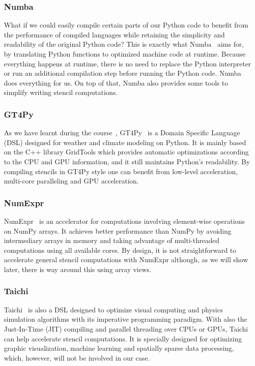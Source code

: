 \documentclass[12pt]{article}
\begin{document}
\subsubsection{Numba}

What if we could easily compile certain parts of our Python code to benefit from the performance of compiled languages while retaining the simplicity and readability of the original Python code? This is exactly what Numba~\cite{Numba} aims for, by translating Python functions to optimized machine code at runtime. Because everything happens at runtime, there is no need to replace the Python interpreter or run an additional compilation step before running the Python code. Numba does everything for us. On top of that, Numba also provides some tools to simplify writing stencil computations.

\subsubsection{GT4Py}

As we have learnt during the course~\cite{HPC4WC}, GT4Py~\cite{GT4Py} is a Domain Specific Language (DSL) designed for weather and climate modeling on Python. It is mainly based on the C++ library GridTools which provides automatic optimizations according to the CPU and GPU information, and it still maintains Python's readability. By compiling stencils in GT4Py style one can benefit from low-level acceleration, multi-core paralleling and GPU acceleration.

\subsubsection{NumExpr}

NumExpr~\cite{NumExpr} is an accelerator for computations involving element-wise operations on NumPy arrays. It achieves better performance than NumPy by avoiding intermediary arrays in memory and taking advantage of multi-threaded computations using all available cores. By design, it is not straightforward to accelerate general stencil computations with NumExpr although, as we will show later, there is way around this using array views.

\subsubsection{Taichi}

Taichi~\cite{Taichi} is also a DSL designed to optimize visual computing and physics simulation algorithms with its imperative programming paradigm. With also the Just-In-Time (JIT) compiling and parallel threading over CPUs or GPUs, Taichi can help accelerate stencil computations. It is specially designed for optimizing graphic visualization, machine learning and spatially sparse data processing, which, however, will not be involved in our case.
\end{document}

